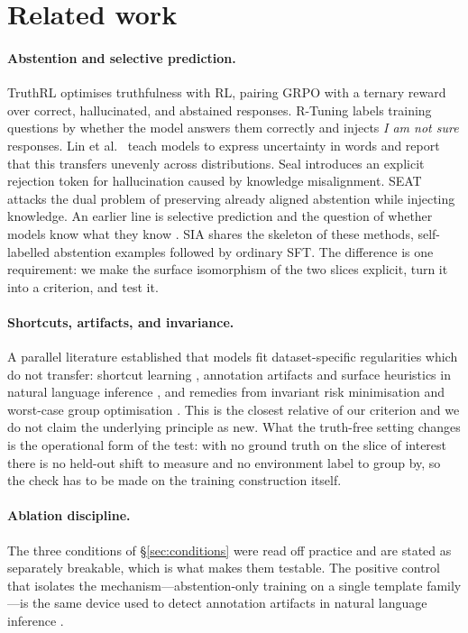 \documentclass[11pt,a4paper]{article}
\begin{document}
\section{Related work}
\label{sec:related}

\paragraph{Abstention and selective prediction.}
TruthRL \cite{truthrl} optimises truthfulness with RL, pairing GRPO with a
ternary reward over correct, hallucinated, and abstained responses. R-Tuning
\cite{rtuning} labels training questions by whether the model answers them
correctly and injects \emph{I am not sure} responses. Lin et al.\ \cite{uncert}
teach models to express uncertainty in words and report that this transfers
unevenly across distributions. Seal \cite{seal} introduces an explicit
rejection token for hallucination caused by knowledge misalignment. SEAT
\cite{seat} attacks the dual problem of preserving already aligned abstention
while injecting knowledge. An earlier line is selective prediction and the
question of whether models know what they know
\cite{selective,knowwhat,calib}. SIA shares the skeleton of these methods,
self-labelled abstention examples followed by ordinary SFT. The difference is
one requirement: we make the surface isomorphism of the two slices explicit,
turn it into a criterion, and test it.

\paragraph{Shortcuts, artifacts, and invariance.}
A parallel literature established that models fit dataset-specific regularities
which do not transfer: shortcut learning \cite{geirhos}, annotation artifacts
and surface heuristics in natural language inference
\cite{artifacts,niven,mccoy}, and remedies from invariant risk minimisation and
worst-case group optimisation \cite{irm,groupdro}. This is the closest relative
of our criterion and we do not claim the underlying principle as new. What the
truth-free setting changes is the operational form of the test: with no ground
truth on the slice of interest there is no held-out shift to measure and no
environment label to group by, so the check has to be made on the training
construction itself.

\paragraph{Ablation discipline.}
The three conditions of \S\ref{sec:conditions} were read off practice and are
stated as separately breakable, which is what makes them testable. The positive
control that isolates the mechanism---abstention-only training on a single
template family---is the same device used to detect annotation artifacts in
natural language inference \cite{artifacts,niven}.
\end{document}
